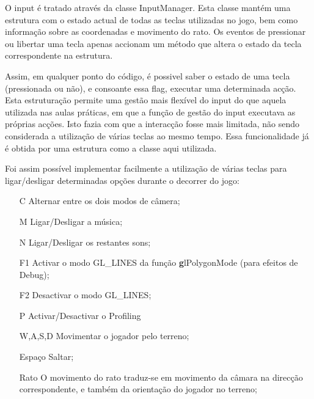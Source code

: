 O input é tratado através da classe InputManager. Esta classe mantém uma estrutura com o estado actual de todas as teclas utilizadas no jogo, bem como informação sobre as coordenadas e movimento do rato. Os eventos de pressionar ou libertar uma tecla apenas accionam um método que altera o estado da tecla correspondente na estrutura.

Assim, em qualquer ponto do código, é possivel saber o estado de uma tecla (pressionada ou não), e consoante essa flag, executar uma determinada acção. Esta estruturação permite uma gestão mais flexível do input do que aquela utilizada nas aulas práticas, em que a função de gestão do input executava as próprias acções. Isto fazia com que a interacção fosse mais limitada, não sendo considerada a utilização de várias teclas ao mesmo tempo. Essa funcionalidade já é obtida por uma estrutura como a classe aqui utilizada.

Foi assim possível implementar facilmente a utilização de várias teclas para ligar/desligar determinadas opções durante o decorrer do jogo:
\begin{itemize}
\item[C] Alternar entre os dois modos de câmera;
\item[M] Ligar/Desligar a música;
\item[N] Ligar/Desligar os restantes sons;
\item[F1] Activar o modo GL\_LINES da função {\textbf glPolygonMode} (para efeitos de Debug);
\item[F2] Desactivar o modo GL\_LINES;
\item[P] Activar/Desactivar o Profiling
\item[W,A,S,D] Movimentar o jogador pelo terreno;
\item[Espaço] Saltar;
\item[Rato] O movimento do rato traduz-se em movimento da câmara na direcção correspondente, e também da orientação do jogador no terreno;
\end{itemize}

